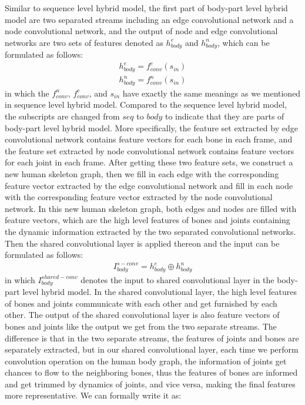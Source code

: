 \documentclass[a4paper,11pt]{article}
\begin{document}
Similar to sequence level hybrid model, the first part of body-part level hybrid model are two separated streams including an edge convolutional network and a node convolutional network, and the output of node and edge convolutional networks are two sets of features denoted as $h_{body}^e$ and $h_{body}^n$, which can be formulated as follows:
\begin{align}
& h_{body}^e = f_{conv}^e (s_{in})&
\end{align}
\begin{align}
& h_{body}^n = f_{conv}^n (s_{in})&
\end{align}
in which the $f_{conv}^n$, $f_{conv}^e$, and $s_{in}$ have exactly the same meanings as we mentioned in sequence level hybrid model.
 Compared to the sequence level hybrid model, the subscripts are changed from $seq$ to $body$ to indicate that they are parts of body-part level hybrid model. More specifically, the feature set extracted by edge convolutional network contains feature vectors for each bone in each frame, and the feature set extracted by node convolutional network contains feature vectors for each joint in each frame. After getting these two feature sets, we construct a new human skeleton graph, then we fill in each edge with the corresponding feature vector extracted by the edge convolutional network and fill in each node with the corresponding feature vector extracted by the node convolutional network. In this new human skeleton graph, both edges and nodes are filled with feature vectors, which are the high level features of bones and joints containing the dynamic information extracted by the two separated convolutional networks. Then the shared convolutional layer is applied thereon and the input can be formulated as follows:
\begin{align}
& I_{body}^{s-conv} = h_{body}^e \oplus h_{body}^n&
\end{align}
in which $I_{body}^{shared-conv}$ denotes the input to shared convolutional layer in the body-part level hybrid model. In the shared convolutional layer, the high level features of bones and joints communicate with each other and get furnished by each other. The output of the shared convolutional layer is also feature vectors of bones and joints like the output we get from the two separate streams. The difference is that in the two separate streams, the features of joints and bones are separately extracted, but in our shared convolutional layer, each time we perform convolution operation on the human body graph, the information of joints get chances to flow to the neighboring bones, thus the features of bones are informed and get trimmed by dynamics of joints, and vice versa, making the final features more representative. We can formally write it as:
\end{document}
